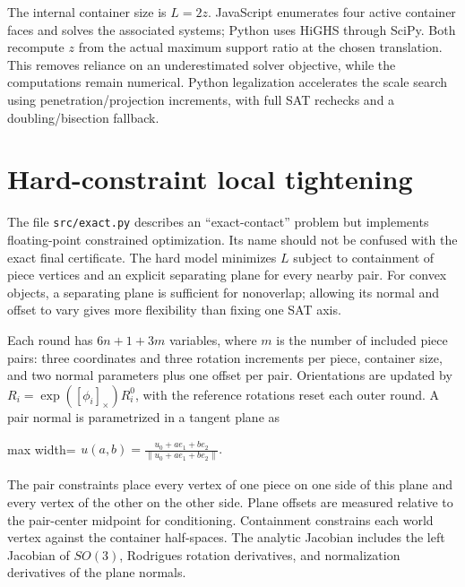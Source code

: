 \documentclass[11pt,a4paper]{article}
\begin{document}
The internal container size is \(L=2z\). JavaScript enumerates four active container faces and solves the associated systems; Python uses HiGHS through SciPy. Both recompute \(z\) from the actual maximum support ratio at the chosen translation. This removes reliance on an underestimated solver objective, while the computations remain numerical. Python legalization accelerates the scale search using penetration/projection increments, with full SAT rechecks and a doubling/bisection fallback.

\section{Hard-constraint local tightening}

The file \nolinkurl{src/exact.py} describes an ``exact-contact'' problem but implements floating-point constrained optimization. Its name should not be confused with the exact final certificate. The hard model minimizes \(L\) subject to containment of piece vertices and an explicit separating plane for every nearby pair. For convex objects, a separating plane is sufficient for nonoverlap; allowing its normal and offset to vary gives more flexibility than fixing one SAT axis.

Each round has \(6n+1+3m\) variables, where \(m\) is the number of included piece pairs: three coordinates and three rotation increments per piece, container size, and two normal parameters plus one offset per pair. Orientations are updated by \(R_i=\exp([\phi_i]_\times)R_i^0\), with the reference rotations reset each outer round. A pair normal is parametrized in a tangent plane as

\begin{center}\begin{adjustbox}{max width=\linewidth}$\displaystyle\begin{aligned}
u(a,b)=\frac{u_0+a e_1+b e_2}{\|u_0+a e_1+b e_2\|}.
\end{aligned}$\end{adjustbox}\end{center}

The pair constraints place every vertex of one piece on one side of this plane and every vertex of the other on the other side. Plane offsets are measured relative to the pair-center midpoint for conditioning. Containment constrains each world vertex against the container half-spaces. The analytic Jacobian includes the left Jacobian of \(SO(3)\), Rodrigues rotation derivatives, and normalization derivatives of the plane normals.
\end{document}
